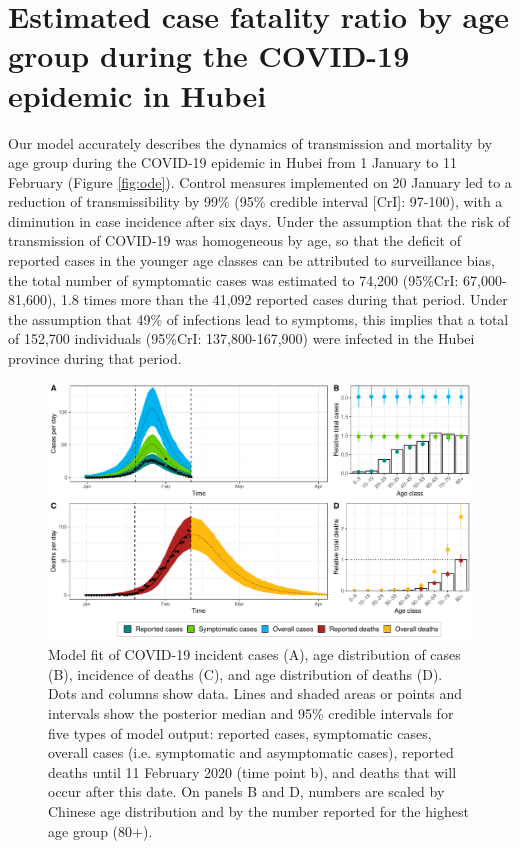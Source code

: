 \documentclass{article}
\begin{document}
\section*{Estimated case fatality ratio by age group during the COVID-19 epidemic in Hubei}

Our model accurately describes the dynamics of transmission and mortality by age group during the COVID-19 epidemic in Hubei from 1 January to 11 February (Figure \ref{fig:ode}). Control measures implemented on 20 January led to a reduction of transmissibility by 99\% (95\% credible interval [CrI]: 97-100), with a diminution in case incidence after six days. Under the assumption that the risk of transmission of COVID-19 was homogeneous by age, so that the deficit of reported cases in the younger age classes can be attributed to surveillance bias, the total number of symptomatic cases was estimated to 74,200 (95\%CrI: 67,000-81,600), 1.8 times more than the 41,092 reported cases during that period. Under the assumption that 49\% of infections lead to symptoms, this implies that a total of 152,700 individuals (95\%CrI: 137,800-167,900) were infected in the Hubei province during that period.

\begin{figure}[t]
	\includegraphics[width=\linewidth]{../figures/fig_fit.pdf}
	\caption{Model fit of COVID-19 incident cases (A), age distribution of cases (B), incidence of deaths (C), and age distribution of deaths (D).  Dots and columns show data. Lines and shaded areas or points and intervals show the posterior median and 95\% credible intervals for five types of model output: reported cases, symptomatic cases, overall cases (i.e. symptomatic and asymptomatic cases), reported deaths until 11 February 2020 (time point b), and deaths that will occur after this date. On panels B and D, numbers are scaled by Chinese age distribution and by the number reported for the highest age group (80+).}
	\label{fig:fit}
\end{figure}
\end{document}
